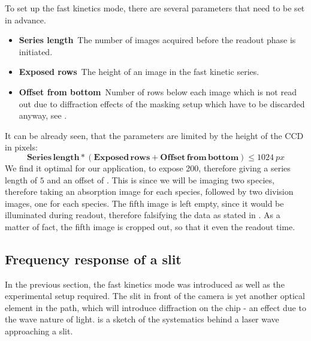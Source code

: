 To set up the fast kinetics mode, there are several parameters that need to be set in advance.
\begin{itemize}
	\item \textbf{Series length}\, The number of images acquired before the readout phase is initiated.
	\item \textbf{Exposed rows}\, The height of an image in the fast kinetic series.
	\item \textbf{Offset from bottom}\, Number of rows below each image which is not read out due to diffraction effects of the masking setup which have to be discarded anyway, see .
\end{itemize}

It can be already seen, that the parameters are limited by the height of the CCD in pixels:
\begin{equation}
\mathbf{Series\,length} * (\mathbf{Exposed\,rows} + \mathbf{Offset\,from\,bottom}) \leq \SI{1024}{px}
\end{equation}
We find it optimal for our application, to expose \SI{200}{\px}, therefore giving a series length of $5$ and an offset of . This is since we will be imaging two species, therefore taking an absorption image for each species, followed by two division images, one for each species. The fifth image is left empty, since it would be illuminated during readout, therefore falsifying the data as stated in . As a matter of fact, the fifth image is cropped out, so that it even the readout time.

\subsection{Frequency response of a slit}
\label{subsec:slit}

In the previous section, the fast kinetics mode was introduced as well as the experimental setup required. The slit in front of the camera is yet another optical element in the path, which will introduce diffraction on the chip - an effect due to the wave nature of light.
 is a sketch of the systematics behind a laser wave approaching a slit.


